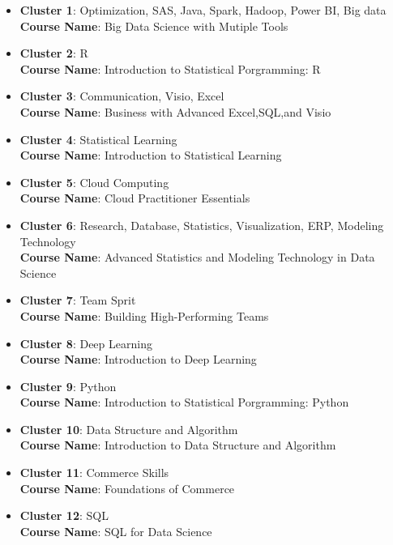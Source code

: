 \documentclass[10pt,onecolumn,letterpaper]{article}
\begin{document}
\begin{itemize}
  \item \textbf{Cluster 1}: Optimization, SAS, Java, Spark, Hadoop, Power BI, Big data \\
        \textbf{Course Name}: Big Data Science with Mutiple Tools
        
  \item \textbf{Cluster 2}: R \\
        \textbf{Course Name}: Introduction to Statistical Porgramming: R
  
  \item \textbf{Cluster 3}: Communication, Visio, Excel\\
        \textbf{Course Name}: Business with Advanced Excel,SQL,and Visio
        
  \item \textbf{Cluster 4}: Statistical Learning \\
        \textbf{Course Name}: Introduction to Statistical Learning
        
  \item \textbf{Cluster 5}: Cloud Computing \\
        \textbf{Course Name}: Cloud Practitioner Essentials
        
  \item \textbf{Cluster 6}: Research, Database, Statistics, Visualization, ERP, Modeling Technology\\
        \textbf{Course Name}: Advanced Statistics and Modeling Technology in Data Science
        
 \item \textbf{Cluster 7}: Team Sprit \\
        \textbf{Course Name}: Building High-Performing Teams
        
 \item \textbf{Cluster 8}: Deep Learning \\
        \textbf{Course Name}: Introduction to Deep Learning
        
 \item \textbf{Cluster 9}: Python \\
        \textbf{Course Name}: Introduction to Statistical Porgramming: Python
        
\item \textbf{Cluster 10}: Data Structure and Algorithm \\
        \textbf{Course Name}: Introduction to Data Structure and Algorithm
        
\item \textbf{Cluster 11}: Commerce Skills\\
        \textbf{Course Name}: Foundations of Commerce
        
\item \textbf{Cluster 12}: SQL \\
        \textbf{Course Name}: SQL for Data Science

\end{itemize}
\end{document}
